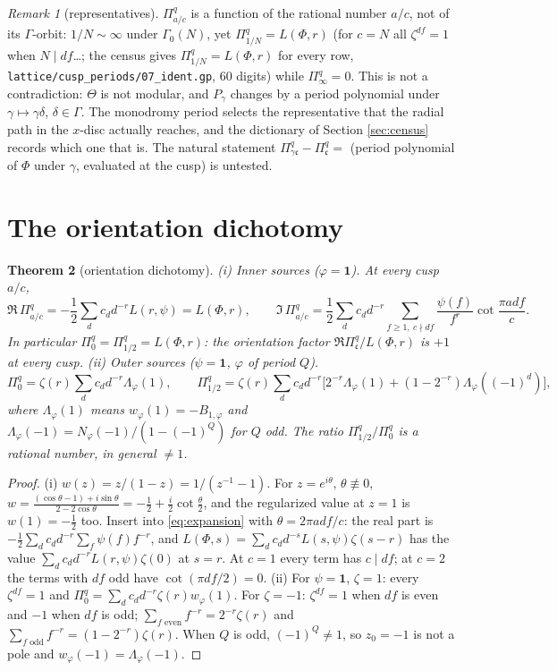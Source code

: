 \documentclass[11pt]{amsart}
\newtheorem{theorem}{Theorem}[section]
\theoremstyle{definition}
\theoremstyle{remark}
\newtheorem{remark}[theorem]{Remark}
\newcommand{\cc}{\mathfrak c}\newcommand{\Pc}{\Pi_{\cc}}\newcommand{\Pq}{\Pi^{q}}
\begin{document}
\begin{remark}[representatives]\label{rem:rep}
$\Pq_{a/c}$ is a function of the rational number $a/c$, not of its $\Gamma$-orbit: $1/N\sim\infty$ under $\Gamma_0(N)$, yet $\Pq_{1/N}=L(\Phi,r)$ (for $c=N$ all $\zeta^{df}=1$ when $N\mid d f$\dots; the census gives $\Pq_{1/N}=L(\Phi,r)$ for every row, \texttt{lattice/cusp\_periods/07\_ident.gp}, $60$ digits) while $\Pq_\infty=0$. This is not a contradiction: $\Theta$ is not modular, and $P_\gamma$ changes by a period polynomial under $\gamma\mapsto\gamma\delta$, $\delta\in\Gamma$. The monodromy period selects the representative that the radial path in the $x$-disc actually reaches, and the dictionary of Section \ref{sec:census} records which one that is. The natural statement $\Pq_{\gamma\cc}-\Pq_{\cc}=$ (period polynomial of $\Phi$ under $\gamma$, evaluated at the cusp) is untested.
\end{remark}

\section{The orientation dichotomy}\label{sec:dichotomy}

\begin{theorem}[orientation dichotomy]\label{thm:dichotomy}
(i) \emph{Inner sources} ($\varphi=\mathbf 1$). At every cusp $a/c$,
$$\Re\,\Pq_{a/c}=-\frac12\sum_dc_dd^{-r}L(r,\psi)=L(\Phi,r),\qquad
\Im\,\Pq_{a/c}=\frac12\sum_dc_dd^{-r}\sum_{f\ge1,\ c\nmid df}\frac{\psi(f)}{f^r}\cot\frac{\pi adf}c .$$
In particular $\Pq_0=\Pq_{1/2}=L(\Phi,r)$: the orientation factor $\Re\Pq_{\cc}/L(\Phi,r)$ is $+1$ at every cusp.
(ii) \emph{Outer sources} ($\psi=\mathbf 1$, $\varphi$ of period $Q$).
$$\Pq_0=\zeta(r)\sum_dc_dd^{-r}\Lambda_\varphi(1),\qquad
\Pq_{1/2}=\zeta(r)\sum_dc_dd^{-r}\bigl[2^{-r}\Lambda_\varphi(1)+(1-2^{-r})\Lambda_\varphi((-1)^d)\bigr],$$
where $\Lambda_\varphi(1)$ means $w_\varphi(1)=-B_{1,\varphi}$ and $\Lambda_\varphi(-1)=N_\varphi(-1)/(1-(-1)^Q)$ for $Q$ odd. The ratio $\Pq_{1/2}/\Pq_0$ is a rational number, in general $\ne1$.
\end{theorem}
\begin{proof}
(i) $w(z)=z/(1-z)=1/(z^{-1}-1)$. For $z=e^{i\theta}$, $\theta\not\equiv0$, $w=\frac{(\cos\theta-1)+i\sin\theta}{2-2\cos\theta}=-\frac12+\frac i2\cot\frac\theta2$, and the regularized value at $z=1$ is $w(1)=-\frac12$ too. Insert into \eqref{eq:expansion} with $\theta=2\pi adf/c$: the real part is $-\frac12\sum_dc_dd^{-r}\sum_f\psi(f)f^{-r}$, and $L(\Phi,s)=\sum_dc_dd^{-s}L(s,\psi)\zeta(s-r)$ has the value $\sum_dc_dd^{-r}L(r,\psi)\zeta(0)$ at $s=r$. At $c=1$ every term has $c\mid df$; at $c=2$ the terms with $df$ odd have $\cot(\pi df/2)=0$. (ii) For $\psi=\mathbf 1$, $\zeta=1$: every $\zeta^{df}=1$ and $\Pq_0=\sum_dc_dd^{-r}\zeta(r)w_\varphi(1)$. For $\zeta=-1$: $\zeta^{df}=1$ when $df$ is even and $-1$ when $df$ is odd; $\sum_{f\text{ even}}f^{-r}=2^{-r}\zeta(r)$ and $\sum_{f\text{ odd}}f^{-r}=(1-2^{-r})\zeta(r)$. When $Q$ is odd, $(-1)^Q\ne1$, so $z_0=-1$ is not a pole and $w_\varphi(-1)=\Lambda_\varphi(-1)$.
\end{proof}
\end{document}
